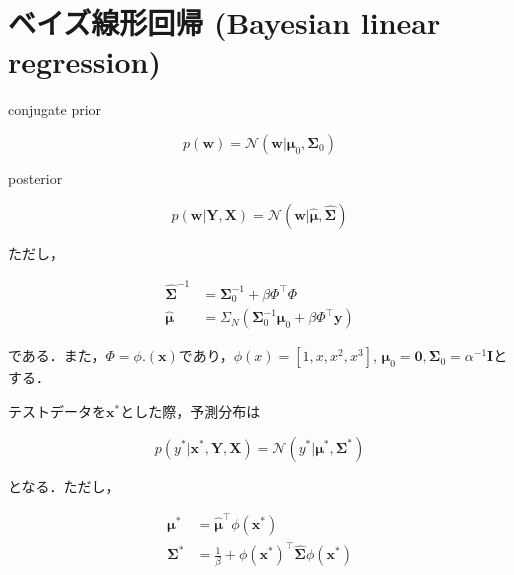 \section{ベイズ線形回帰 (Bayesian linear regression)}
conjugate prior


\begin{equation}
p(\mathbf{w})=\mathcal{N}(\mathbf{w}|\boldsymbol{\mu}_0, \mathbf{\Sigma}_0)
\end{equation}


posterior


\begin{equation}
p(\mathbf{w}|\mathbf{Y}, \mathbf{X})=\mathcal{N}(\mathbf{w}|\hat{\boldsymbol{\mu}}, \hat{\mathbf{\Sigma}})
\end{equation}


ただし，


\begin{align}
\hat{\mathbf{\Sigma}}^{-1}&= \mathbf{\Sigma}_0^{-1}+ \beta \Phi^\top\Phi\\
\hat{\boldsymbol{\mu}}&=\Sigma_N (\mathbf{\Sigma}_0^{-1}\boldsymbol{\mu}_0+\beta \Phi^\top \mathbf{y})
\end{align}


である．また，$\Phi=\phi.(\mathbf{x})$であり，$\phi(x)=[1, x, x^2, x^3]$, $\boldsymbol{\mu}_0=\mathbf{0}, \mathbf{\Sigma}_0= \alpha^{-1} \mathbf{I}$とする．

テストデータを$\mathbf{x}^*$とした際，予測分布は


\begin{equation}
p(y^*|\mathbf{x}^*, \mathbf{Y}, \mathbf{X})=\mathcal{N}(y^*|\boldsymbol{\mu}^*, \mathbf{\Sigma}^*)
\end{equation}


となる．ただし，


\begin{align}
\boldsymbol{\mu}^*&=\hat{\boldsymbol{\mu}}^\top \phi(\mathbf{x}^*)\\
\mathbf{\Sigma}^* &= \frac{1}{\beta} +  \phi(\mathbf{x}^*)^\top\hat{\mathbf{\Sigma}}\phi(\mathbf{x}^*)\\
\end{align}






